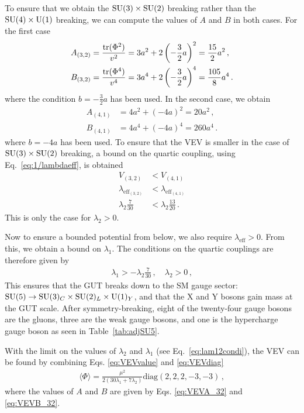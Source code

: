 To ensure that we obtain the $\mathrm{SU}(3) \times \mathrm{SU}(2)$ breaking rather than the $\mathrm{SU}(4) \times \mathrm{U}(1)$ breaking, we can compute the values of $A$ and $B$ in both cases. For the first case 
\begin{align}
    A_{(3,2)} &= \frac{\operatorname{tr}(\Phi^2)}{v^2} = 3a^2 + 2\left(-\frac{3}{2}a\right)^2 = \frac{15}{2} a^2 \,, \label{eq:VEVA_32} \\
    B_{(3,2)} &= \frac{\operatorname{tr}(\Phi^4)}{v^4} = 3a^4 + 2\left(-\frac{3}{2}a\right)^4 = \frac{105}{8} a^4 \,. \label{eq:VEVB_32}
\end{align}
where the condition $b=-\frac{3}{2}a$ has been used. In the second case, we obtain 
\begin{align}
    A_{(4,1)} &=  4a^2 + (-4a)^2 = 20a^2 \,, \label{eq:VEVA_41} \\
    B_{(4,1)} &= 4a^4 + (-4a)^4 = 260a^4 \,. \label{eq:VEVB_41}
\end{align}
where $b=-4a$ has been used. To ensure that the VEV is smaller in the case of $\mathrm{SU}(3) \times \mathrm{SU}(2)$ breaking, a bound on the quartic coupling, using Eq.~\eqref{eq:1/lambdaeff}, is obtained
\begin{align}
    V_{(3,2)}&<V_{(4,1)}\\
    \lambda_{\text{eff}_{(3,2)}}&<\lambda_{\text{eff}_{(4,1)}}
    \\\lambda_2 \frac{7}{30}&<\lambda_2\frac{13}{20}\,.
\end{align}
This is only the case for $\lambda_2>0$. 

Now to ensure a bounded potential from below, we also require $\lambda_{\text{eff}}>0$. From this, we obtain a bound on $\lambda_1$. The conditions on the quartic couplings are therefore given by
\begin{align}
    \lambda_1>-\lambda_2\frac{7}{30}\,,\quad\lambda_2>0\,,\label{eq:lam12condi}
\end{align}
This ensures that the GUT breaks down to the SM gauge sector: $\mathrm{SU}(5)\to\mathrm{SU}(3)_C\times\mathrm{SU}(2)_L\times\mathrm{U}(1)_Y$, and that the X and Y bosons gain mass at the GUT scale. After symmetry-breaking, eight of the twenty-four gauge bosons are the gluons, three are the weak gauge bosons, and one is the hypercharge gauge boson \cite{Pernow:2021fvb} as seen in Table~\ref{tab:adjSU5}.

With the limit on the values of $\lambda_2$ and $\lambda_1$ (see Eq.~\eqref{eq:lam12condi}), the VEV can be found by combining Eqs. \eqref{eq:VEVvalue} and \eqref{eq:VEVdiag}
\begin{align}
    \langle \Phi\rangle=\frac{\mu^2}{2(30\lambda_1+7\lambda_2)}\mathrm{diag}(2,2,2,-3,-3)\,,
\end{align}
where the values of $A$ and $B$ are given by Eqs. \eqref{eq:VEVA_32} and \eqref{eq:VEVB_32}.

